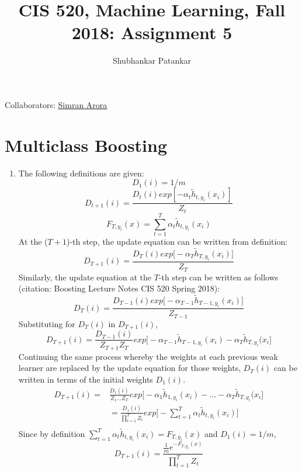 \documentclass[english]{article}
\title{CIS 520, Machine Learning, Fall 2018: Assignment 5}
\author{Shubhankar Patankar}
\begin{document}
\maketitle

{\normalsize \noindent Collaborators: 
 \underline{Simran Arora}} \\

\section{Multiclass Boosting}
\begin{enumerate}

    \item The following definitions are given:
    $$D_1(i) = 1/m$$
    $$D_{t+1}(i) = \frac{D_t(i)exp[-\alpha_t \widetilde{h}_{t,y_i}(x_i)]}{Z_t}$$
    $$F_{T,y_i}(x) = \sum_{t=1}^{T} \alpha_t \widetilde{h}_{t,y_i}(x_i)$$
    At the ($T+1$)-th step, the update equation can be written from definition:
    $$D_{T+1}(i) = \frac{D_T(i)exp\big[-\alpha_T \widetilde{h}_{T,y_i}(x_i)\big]}{Z_T}$$
    Similarly, the update equation at the $T$-th step can be written as follows (citation: Boosting Lecture Notes CIS 520 Spring 2018):
    $$D_{T}(i) = \frac{D_{T-1}(i)exp\big[-\alpha_{T-1} \widetilde{h}_{T-1,y_i}(x_i)\big]}{Z_{T-1}}$$
    Substituting for $D_{T}(i)$ in $D_{T+1}(i)$,
    $$D_{T+1}(i) = \frac{D_{T-1}(i)}{Z_{T+1}Z_T} exp\big[-\alpha_{T-1} \widetilde{h}_{T-1,y_i}(x_i) - \alpha_T \widetilde{h}_{T,y_i}(x_i\big] $$
    Continuing the same process whereby the weights at each previous weak learner are replaced by the update equation for those weights, $D_{T}(i)$ can be written in terms of the initial weights $D_1(i)$.
     \begin{align*}
     D_{T+1}(i)  {}={} & \frac{D_{1}(i)}{Z_1 \dots Z_T} exp\big[-\alpha_{1} \widetilde{h}_{1,y_i}(x_i) - \dots - \alpha_T \widetilde{h}_{T,y_i}(x_i\big] \\
     & = \frac{D_{1}(i)}{\prod_{t=1}^{T} Z_t} exp\bigg[- \sum_{t=1}^{T} \alpha_{t} \widetilde{h}_{t,y_i}(x_i)\bigg] \\
     \end{align*}
     Since by definition $\sum_{t=1}^{T} \alpha_{t} \widetilde{h}_{t,y_i}(x_i) = F_{T,y_i}(x)$ and $D_1(i) = 1/m$,
     $$ D_{T+1}(i) = \frac{\frac{1}{m} e^{- F_{T,y_i}(x)}}{\prod_{t=1}^{T} Z_t}$$ 
    

\end{enumerate}
\end{document}
